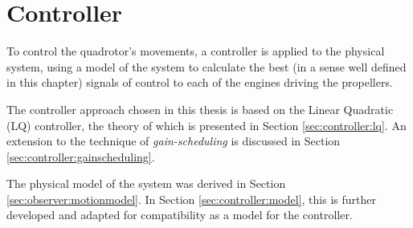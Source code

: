 \chapter{Controller}
\label{cha:controller}
    To control the quadrotor's movements, a controller is applied to the
    physical system, using a model of the system to calculate the best
    (in a sense well defined in this chapter) signals of control to each
    of the engines driving the propellers.

    The controller approach chosen in this thesis is based on the Linear Quadratic (LQ)
    controller, the theory of which is presented in Section \ref{sec:controller:lq}.
    An extension to the technique of \textit{gain-scheduling} is discussed
    in Section \ref{sec:controller:gainscheduling}.

    The physical model of the system was derived in Section \ref{sec:observer:motionmodel}.
    In Section \ref{sec:controller:model}, this is further developed
    and adapted for compatibility as a model for the controller.

    
    
    
